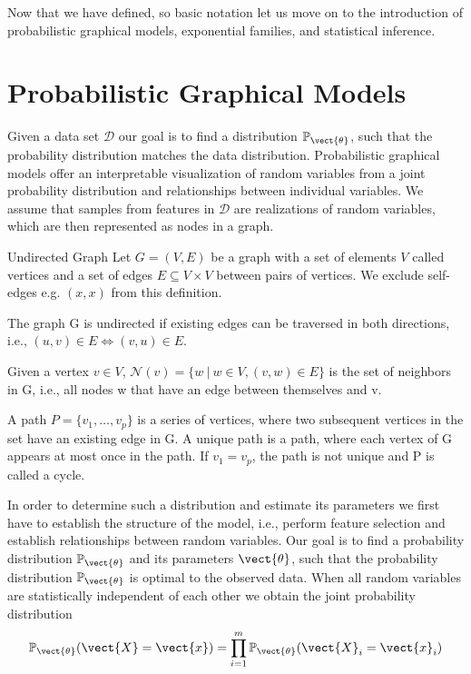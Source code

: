     Now that we have defined, so basic notation let us move on to the introduction of probabilistic graphical models, exponential families, and statistical inference.


\section{Probabilistic Graphical Models}
\label{sec:pgm}
Given a data set $\mathcal{D}$ our goal is to find a distribution $\mathbb{P}_{\vect{\theta}}$, such that the probability distribution matches the data distribution.
Probabilistic graphical models offer an interpretable visualization of random variables from a joint probability distribution and relationships between individual variables.
We assume that samples from features in $\mathcal{D}$ are realizations of random variables, which are then represented as nodes in a graph.
    \begin{definition}{Undirected Graph}
        Let $G=(V,E)$ be a graph with a set of elements $V$ called vertices and a set of edges $E \subseteq V \times V$ between pairs of vertices. 
        We exclude self-edges e.g. $(x,x)$ from this definition.

        The graph G is undirected if existing edges can be traversed in both directions, i.e., $(u,v) \in E \Leftrightarrow (v,u) \in E$.

        Given a vertex $v \in V$, $\mathcal{N}(v) = \{w \:\lvert\: w \in V, (v,w) \in E\}$ is the set of neighbors in G, i.e., all nodes w that have an edge between themselves and v.

        A path $P = \{v_1, \ldots, v_p\}$ is a series of vertices, where two subsequent vertices in the set have an existing edge in G. 
        A unique path is a path, where each vertex of G appears at most once in the path.
        If $v_1 = v_p$, the path is not unique and P is called a cycle.
    \end{definition}
In order to determine such a distribution and estimate its parameters we first have to establish the structure of the model, i.e., perform feature selection and establish relationships between random variables.
Our goal is to find a probability distribution $\mathbb{P}_{\vect{\theta}}$ and its parameters $\vect{\theta}$, such that the probability distribution $\mathbb{P}_{\vect{\theta}}$ is optimal \wrt to the observed data.
When all random variables are statistically independent of each other  we obtain the joint probability distribution
\begin{equation}
    \mathbb{P}_{\vect{\theta}}(\vect{X} = \vect{x}) = \prod_{i=1}^m \mathbb{P}_{\vect{\theta}}(\vect{X}_i = \vect{x}_i)
\end{equation}
